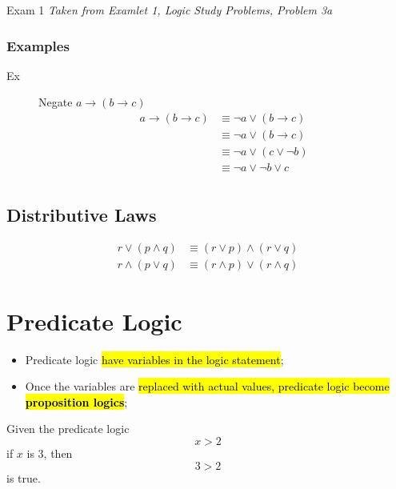 \documentclass{note}
\begin{document}
\begin{note}{Exam 1}
        \textit{Taken from Examlet 1, Logic Study Problems, Problem 3a}

        \subsubsection{Examples}
        \begin{description}
            \item[Ex] Negate $ a \to \left(b \to c \right) $
            \begin{align*}
                a \to \left(b \to c \right) &\equiv \neg a \vee \left(b \to c\right)\\
                &\equiv \neg a \vee \left( b \to c \right)\\
                &\equiv \neg a \vee \left( c \vee \neg b \right)\\
                &\equiv \neg a \vee \neg b \vee c\\
            \end{align*}
        \end{description}

        \subsection{Distributive Laws}
        \begin{align*}
            r \vee \left( p \wedge q \right) &\equiv \left(r \vee p\right) \wedge \left(r \vee q \right)\\
            r \wedge \left( p \vee q \right) &\equiv \left(r \wedge p\right) \vee \left(r \wedge q \right)
        \end{align*}

        \section{Predicate Logic}

        \begin{itemize}
            \item Predicate logic \hl{have variables in the logic statement};
            \item Once the variables are \hl{replaced with actual values, predicate logic become 
            \textbf{proposition logics}};
        \end{itemize}

        Given the predicate logic 
        \begin{displaymath}
            x > 2
        \end{displaymath}
            if $ x $ is 3, then
        \begin{displaymath}
            3 > 2
        \end{displaymath}
            is true.


\end{note}
\end{document}
